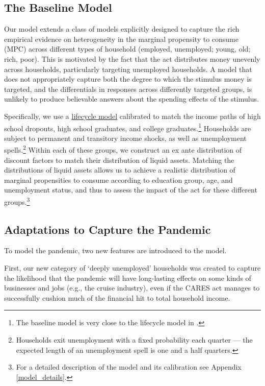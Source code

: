 \documentclass[titlepage,a4paper]{\econtex}
\begin{document}
\subsection{The Baseline Model}

Our model extends a class of models explicitly designed to capture the rich empirical evidence on heterogeneity in the marginal propensity to consume (MPC) across different types of household (employed, unemployed; young, old; rich, poor).  This is motivated by the fact that the act distributes money unevenly across households, particularly targeting unemployed households.  A model that does not appropriately capture both the degree to which the stimulus money is targeted, and the differentials in responses across differently targeted groups, is unlikely to produce believable answers about the spending effects of the stimulus.

Specifically, we use a \href{https://pubs.aeaweb.org/doi/pdfplus/10.1257/jep.15.3.3}{lifecycle model} calibrated to match the income paths of high school dropouts, high school graduates, and college graduates.\footnote{The baseline model is very close to the lifecycle model in \cite{cstwMPC}.}
Households are subject to permanent and transitory income shocks, as well as unemployment spells.\footnote{Households exit unemployment with a fixed probability each quarter --- the expected length of an unemployment spell is one and a half quarters.}
Within each of these groups, we construct an ex ante distribution of discount factors to match their distribution of liquid assets.
Matching the distributions of liquid assets allows us to achieve a realistic distribution of marginal propensities to consume according to education group, age, and unemployment status, and thus to assess the impact of the act for these different groups.\footnote{For a detailed description of the model and its calibration see Appendix \ref{model_details}.}

\subsection{Adaptations to Capture the Pandemic}

To model the pandemic, two new features are introduced to the model.

First, our new category of `deeply unemployed' households was created to capture the likelihood that the pandemic will have long-lasting effects on some kinds of businesses and jobs (e.g., the cruise industry), even if the CARES act manages to successfully cushion much of the financial hit to total household income.
\end{document}

